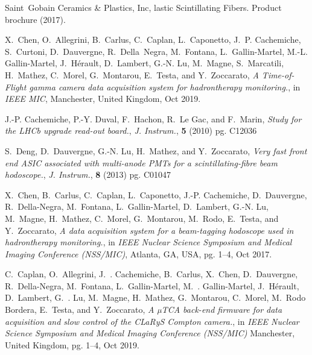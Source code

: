 \documentclass[a4paper,11pt]{article}
\begin{document}
\begin{thebibliography}{99}
{Saint~Gobain Ceramics \& Plastics, Inc},
lastic {S}cintillating {F}ibers.
\newblock Product brochure (2017).

X.~Chen, O.~Allegrini, B.~Carlus, C.~Caplan, L.~Caponetto, J.~P. Cachemiche,
  S.~Curtoni, D.~Dauvergne, R.~Della~Negra, M.~Fontana, L.~Gallin-Martel, M.-L.
  Gallin-Martel, J.~H{\'e}rault, D.~Lambert, G.-N. Lu, M.~Magne, S.~Marcatili,
  H.~Mathez, C.~Morel, G.~Montarou, E.~Testa, and Y.~Zoccarato, \emph{A {T}ime-of-{F}light gamma camera data acquisition system for hadrontherapy monitoring.}, in \emph{{IEEE MIC}}, Manchester, United Kingdom, Oct 2019.

J.-P. Cachemiche, P.-Y. Duval, F.~Hachon, R.~Le Gac, and F.~Marin, \emph{Study for the {LHCb} upgrade read-out board.}, \emph{J. Instrum.}, \textbf{5} (2010) pg. C12036

S.~Deng, D.~Dauvergne, G.-N. Lu, H.~Mathez, and Y.~Zoccarato, \emph{Very fast front end {ASIC} associated with multi-anode {PMTs} for a
  scintillating-fibre beam hodoscope.}, \emph{J. Instrum.}, \textbf{8} (2013) pg. C01047

X.~Chen, B.~Carlus, C.~Caplan, L.~Caponetto, J.-P. Cachemiche, D.~Dauvergne,
  R.~Della-Negra, M.~Fontana, L.~Gallin-Martel, D.~Lambert, G.-N. Lu, M.~Magne,
  H.~Mathez, C.~Morel, G.~Montarou, M.~Rodo, E.~Testa, and Y.~Zoccarato, \emph{A data acquisition system for a beam-tagging hodoscope used in
  hadrontherapy monitoring.}, in \emph{IEEE Nuclear Science Symposium and Medical Imaging Conference (NSS/MIC)}, Atlanta, GA, USA,  pg. 1--4, Oct 2017.

C.~{Caplan}, O.~{Allegrini}, J.~. {Cachemiche}, B.~{Carlus}, X.~{Chen},
  D.~{Dauvergne}, R.~{Della-Negra}, M.~{Fontana}, L.~{Gallin-Martel}, M.~.
  {Gallin-Martel}, J.~{Hérault}, D.~{Lambert}, G.~. {Lu}, M.~{Magne},
  H.~{Mathez}, G.~{Montarou}, C.~{Morel}, M.~{Rodo Bordera}, E.~{Testa}, and
  Y.~{Zoccarato}, \emph{A µ{TCA} back-end firmware for data acquisition and slow control of the {CL}a{R}y{S} {C}ompton camera.}, in \emph{IEEE Nuclear Science Symposium and Medical Imaging Conference (NSS/MIC)} Manchester, United Kingdom, pg. 1--4, Oct 2019.


\end{thebibliography}
\end{document}
